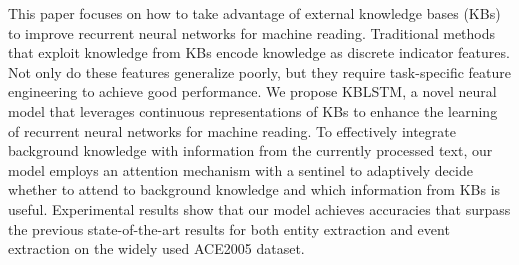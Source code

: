 This paper focuses on how to take advantage of external knowledge bases (KBs) to improve recurrent neural networks for machine reading. Traditional methods that exploit knowledge from KBs encode knowledge as discrete indicator features. Not only do these features generalize poorly, but they require task-specific feature engineering to achieve good performance. We propose KBLSTM, a novel neural model that leverages continuous representations of KBs to enhance the learning of recurrent neural networks for machine reading. To effectively integrate background knowledge with information from the currently processed text, our model employs an attention mechanism with a sentinel to adaptively decide whether to attend to background knowledge and which information from KBs is useful. Experimental results show that our model achieves accuracies that surpass the previous state-of-the-art results for both entity extraction and event extraction on the widely used ACE2005 dataset.
